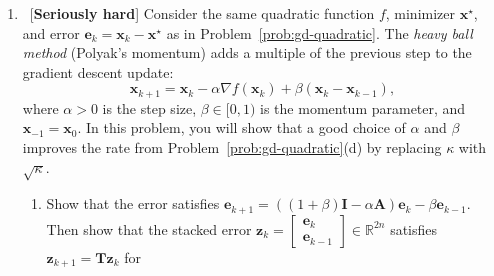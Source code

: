 \documentclass[letterpaper]{article}
\newcommand{\Real}{\mathbb{R}}
\newcommand{\opt}{^\star}
\begin{document}
\begin{enumerate}
\begin{enumerate}
    \[
      \| \bm{e}_k \| \le \rho(\alpha)^k \, \| \bm{e}_0 \|,
      \qquad \text{where} \qquad
      \rho(\alpha) = \max_{i=1,\dots,n} |1 - \alpha \lambda_i| = \max \left\{ |1 - \alpha \lambda_{\min}|,\; |1 - \alpha \lambda_{\max}| \right\}.
    \]
    \emph{Hint}: Express $\bm{e}_k$ in the basis of the eigenvectors of $\bm{A}$ and recall that multiplying by an orthogonal matrix does not change the Euclidean norm.
  \item Show that gradient descent converges to $\bm{x}\opt$ from every starting point $\bm{x}_0$ if and only if $0 < \alpha < 2 / \lambda_{\max}$. What happens to the iterates when $\alpha > 2/\lambda_{\max}$?
  \item Find the step size $\alpha\opt$ that minimizes $\rho(\alpha)$ and show that
    \[
      \rho(\alpha\opt) = \frac{\kappa - 1}{\kappa + 1},
      \qquad \text{where} \qquad
      \kappa = \frac{\lambda_{\max}}{\lambda_{\min}}
    \]
    is the condition number of $\bm{A}$. Approximately how many iterations are needed to reduce the error by a factor of $10^{-6}$ when $\kappa = 10$ and when $\kappa = 1000$? Explain what this implies about gradient descent on poorly conditioned problems.
  \end{enumerate}
\item \ [\textbf{Seriously hard}] \label{item:superhard} Consider the same quadratic function $f$, minimizer $\bm{x}\opt$, and error $\bm{e}_k = \bm{x}_k - \bm{x}\opt$ as in Problem~\ref{prob:gd-quadratic}. The \emph{heavy ball method} (Polyak's momentum) adds a multiple of the previous step to the gradient descent update:
  \[
    \bm{x}_{k+1} = \bm{x}_k - \alpha \nabla f(\bm{x}_k) + \beta \left( \bm{x}_k - \bm{x}_{k-1} \right),
  \]
  where $\alpha > 0$ is the step size, $\beta \in [0, 1)$ is the momentum parameter, and $\bm{x}_{-1} = \bm{x}_0$. In this problem, you will show that a good choice of $\alpha$ and $\beta$ improves the rate from Problem~\ref{prob:gd-quadratic}(d) by replacing $\kappa$ with $\sqrt{\kappa}$.
  \begin{enumerate}
  \item Show that the error satisfies $\bm{e}_{k+1} = \left( (1+\beta)\bm{I} - \alpha \bm{A} \right) \bm{e}_k - \beta \bm{e}_{k-1}$. Then show that the stacked error $\bm{z}_k = \begin{bmatrix} \bm{e}_k \\ \bm{e}_{k-1} \end{bmatrix} \in \Real^{2n}$ satisfies $\bm{z}_{k+1} = \bm{T} \bm{z}_k$ for

\end{enumerate}
\end{enumerate}
\end{document}
